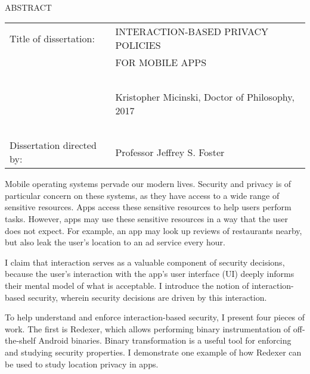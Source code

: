 
\hbox{\ }

\renewcommand{\baselinestretch}{1}
\small \normalsize

\begin{center}
\large{{ABSTRACT}} 

\vspace{3em} 

\end{center}
\hspace{-.15in}
\begin{tabular}{ll}
Title of dissertation:    & {\large  INTERACTION-BASED PRIVACY POLICIES}\\
&				      {\large  FOR MOBILE APPS} \\
\ \\
&                          {\large  Kristopher Micinski, Doctor of Philosophy, 2017} \\
\ \\
Dissertation directed by: & {\large  Professor Jeffrey S. Foster} \\
\end{tabular}

\vspace{3em}

\renewcommand{\baselinestretch}{2}
\large \normalsize

Mobile operating systems pervade our modern lives. Security and
privacy is of particular concern on these systems, as they have access
to a wide range of sensitive resources. Apps access these sensitive
resources to help users perform tasks. However, apps may use these
sensitive resources in a way that the user does not expect. For
example, an app may look up reviews of restaurants nearby, but also
leak the user's location to an ad service every hour.

I claim that interaction serves as a valuable component of security
decisions, because the user's interaction with the app's user
interface (UI) deeply informs their mental model of what is
acceptable. I introduce the notion of interaction-based security,
wherein security decisions are driven by this interaction.

To help understand and enforce interaction-based security, I present
four pieces of work. The first is Redexer, which allows performing
binary instrumentation of off-the-shelf Android binaries. Binary
transformation is a useful tool for enforcing and studying security
properties. I demonstrate one example of how Redexer can be used to
study location privacy in apps.


